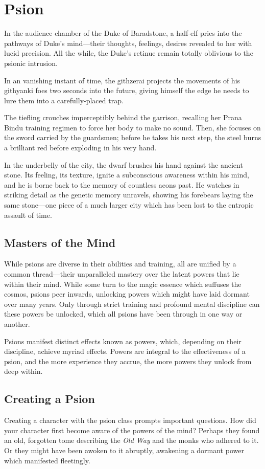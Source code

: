 \section{Psion}
\label{sec:psion}
\DndSetThemeColor[DmgLavender]
In the audience chamber of the Duke of Baradstone,
a half-elf pries into the pathways of Duke's mind---their
thoughts, feelings, desires revealed to her
with lucid precision.
All the while, the Duke's retinue remain totally oblivious
to the psionic intrusion.

In an vanishing instant of time,
the githzerai projects the movements of his
githyanki foes two seconds into the future,
giving himself the edge he needs to lure them
into a carefully-placed trap.

The tiefling crouches imperceptibly behind the garrison,
recalling her Prana Bindu training regimen to force
her body to make no sound.
Then, she focuses on the sword carried by the guardsmen;
before he takes his next step,
the steel burns a brilliant red before exploding in his
very hand.

In the underbelly of the city,
the dwarf brushes his hand against the ancient stone.
Its feeling, its texture, ignite a subconscious
awareness within his mind,
and he is borne back to the memory of countless aeons
past.
He watches in striking detail as the genetic memory unravels,
showing his forebears laying the same stone---one piece
of a much larger city which has been lost to the entropic
assault of time.

\subsection{Masters of the Mind}
While psions are diverse in their abilities and training,
all are unified by a common thread---their unparalleled
mastery over the latent powers that lie within their mind.
While some turn to the magic essence which suffuses the cosmos,
psions peer inwards,
unlocking powers which might have laid dormant over many years.
Only through strict training and profound mental discipline
can these powers be unlocked,
which all psions have been through in one way or another.

Psions manifest distinct effects known as powers, which,
depending on their discipline, achieve myriad effects.
Powers are integral to the effectiveness of a psion,
and the more experience they accrue,
the more powers they unlock from deep within.

\subsection{Creating a Psion}
Creating a character with the psion class prompts
important questions.
How did your character first become aware of the
powers of the mind?
Perhaps they found an old, forgotten tome
describing the \emph{Old Way} and the monks who adhered
to it.
Or they might have been awoken to it abruptly,
awakening a dormant power which manifested fleetingly.

